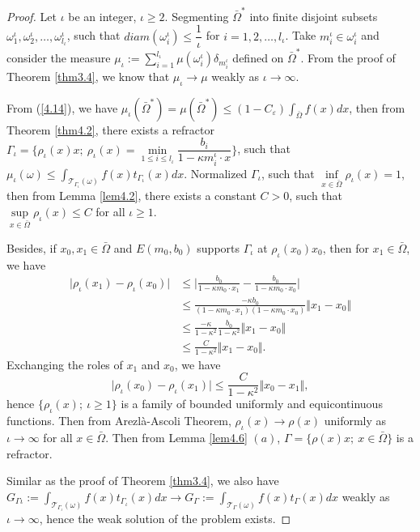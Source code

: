 \documentclass[a4paper,12pt,]{article}
\numberwithin{equation}{section}
\numberwithin{equation}{section} \allowdisplaybreaks
\begin{document}
\begin{proof}
  Let $\iota$ be an integer, $\iota \geq 2$. Segmenting $\bar{\Omega}^{\ast}$ into finite disjoint subsets $\omega_{1}^{\iota}, \omega_{2}^{\iota}, \ldots,\omega_{l_{\iota}}^{\iota}$, such that $diam(\omega_{i}^{\iota}) \leq \dfrac{1}{\iota}$ for $i = 1,2,\ldots,l_{\iota}$. Take $m_{i}^{\iota} \in \omega_{i}^{\iota}$ and consider the measure $\mu_{\iota} := \sum\limits_{i = 1}^{l _{\iota}}\mu(\omega_{i}^{\iota}) \delta_{m_{i}^{\iota}}$ defined on $\bar{\Omega}^{\ast}$. From the proof of Theorem \ref{thm3.4}, we know that $\mu_{\iota} \rightarrow \mu$ weakly as $\iota \rightarrow \infty$.

  From (\ref{4.14}), we have $\mu_{\iota}(\bar{\Omega}^{\ast}) = \mu(\bar{\Omega}^{\ast}) \leq (1 - C_{\varepsilon})\displaystyle\int_{\bar{\Omega}}f(x)dx$, then from Theorem \ref{thm4.2}, there exists a refractor $\Gamma_{\iota} = \{\rho_{\iota}(x)x;~\rho_{\iota}(x) = \min\limits_{1 \leq i \leq l_{\iota}}\dfrac{b_{i}}{1 - \kappa m_{i}^{\iota} \cdot x}\}$, such that $\mu_{\iota}(\omega) \leq \displaystyle\int_{\mathcal{T}_{\Gamma_{\iota}}(\omega)}f(x)t_{\Gamma_{\iota}}(x)dx$. Normalized $\Gamma_{\iota}$, such that $\inf\limits_{x \in \bar{\Omega}}\rho_{\iota}(x) = 1$, then from Lemma \ref{lem4.2}, there exists a constant $C>0$, such that $\sup\limits_{x \in \bar{\Omega}}\rho_{\iota}(x) \leq C$ for all $\iota \geq 1$.

  Besides, if $x_{0}, x_{1} \in \bar{\Omega}$ and $E(m_{0},b_{0})$ supports $\Gamma_{\iota}$ at $\rho_{\iota}(x_{0})x_{0}$, then for $x_{1} \in \bar{\Omega}$, we have
  \begin{align*}
    \vert \rho_{\iota}(x_{1}) - \rho_{\iota}(x_{0}) \vert & \leq \vert \frac{b_{0}}{1 - \kappa m_{0} \cdot x_{1}} - \frac{b_{0}}{1 - \kappa m_{0} \cdot x_{0}} \vert\\
      & \leq \frac{-\kappa b_{0}}{(1 - \kappa m_{0} \cdot x_{1})(1 - \kappa m_{0} \cdot x_{0})} \Vert x_{1} - x_{0} \Vert \\
      & \leq \frac{-\kappa}{1 - \kappa^{2}}\frac{b_{0}}{1 - \kappa^{2}} \Vert x_{1} - x_{0} \Vert\\
      & \leq \frac{C}{1 - \kappa^{2}} \Vert x_{1} - x_{0} \Vert.
  \end{align*}
  Exchanging the roles of $x_{1}$ and $x_{0}$, we have
  $$\vert \rho_{\iota}(x_{0}) - \rho_{\iota}(x_{1}) \vert \leq \frac{C}{1 - \kappa^{2}} \Vert x_{0} - x_{1} \Vert,$$
  hence $\{\rho_{\iota}(x);~\iota \geq 1\}$ is a family of bounded uniformly and equicontinuous functions. Then from Arezlà-Ascoli Theorem, $\rho_{\iota}(x) \rightarrow \rho(x)$ uniformly as $\iota \rightarrow \infty$ for all $x \in \bar{\Omega}$. Then from Lemma \ref{lem4.6} $(a)$, $\Gamma = \{\rho(x)x;~x \in \bar{\Omega}\}$ is a refractor. 
  
  Similar as the proof of Theorem \ref{thm3.4}, we also have $G_{\Gamma{\iota}} := \displaystyle \int_{\mathcal{T}_{\Gamma_{\iota}}(\omega)}f(x)t_{\Gamma_{\iota}}(x)dx \rightarrow G_{\Gamma} := \displaystyle \int_{\mathcal{T}_{\Gamma}(\omega)}f(x)t_{\Gamma}(x)dx$ weakly as $\iota \rightarrow \infty$, hence the weak solution of the problem exists.
\end{proof}
\end{document}

